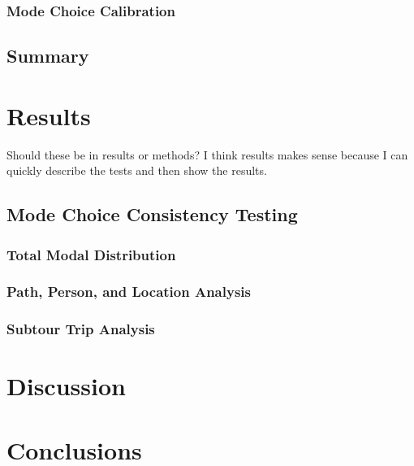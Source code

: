 \documentclass[12pt, oneside, openright]{byuthesis}
\begin{document}
\hypertarget{clib}{%
\subsection{Mode Choice Calibration}\label{clib}}

\hypertarget{summary-1}{%
\section{Summary}\label{summary-1}}

\hypertarget{results}{%
\chapter{Results}\label{results}}

Should these be in results or methods? I think results makes sense because I can quickly describe the tests and then show the results.

\hypertarget{mcomp}{%
\section{Mode Choice Consistency Testing}\label{mcomp}}

\hypertarget{total-modal-distribution}{%
\subsection{Total Modal Distribution}\label{total-modal-distribution}}

\hypertarget{path-person-and-location-analysis}{%
\subsection{Path, Person, and Location Analysis}\label{path-person-and-location-analysis}}

\hypertarget{subtour-trip-analysis}{%
\subsection{Subtour Trip Analysis}\label{subtour-trip-analysis}}

\hypertarget{discussion}{%
\chapter{Discussion}\label{discussion}}

\hypertarget{conclusions}{%
\chapter{Conclusions}\label{conclusions}}
\end{document}
